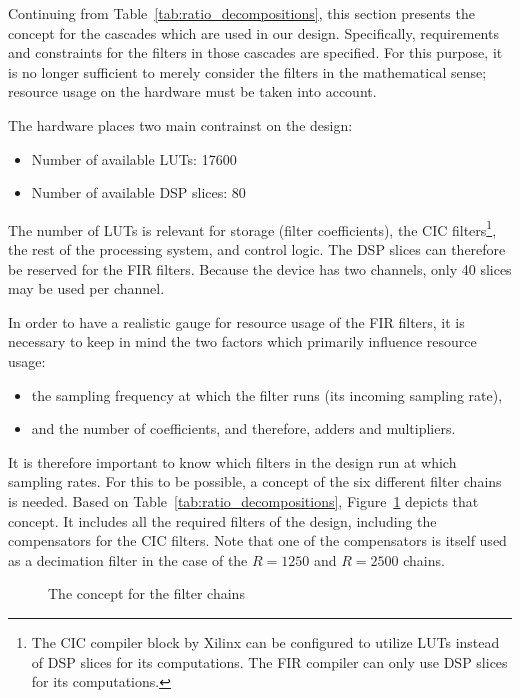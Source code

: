 Continuing  from Table~\ref{tab:ratio_decompositions},  this section  presents
the  concept for  the cascades  which  are used  in our  design. Specifically,
requirements and constraints for the  filters in those cascades are specified.
For this purpose, it is no longer sufficient to merely consider the filters in
the mathematical  sense; resource  usage on  the hardware  must be  taken into
account.

The hardware places two main contrainst on the design:
\begin{itemize}\tightlist
    \item
        Number of available LUTs: \num{17600}
    \item
        Number of available DSP slices: \num{80}
\end{itemize}
The number  of LUTs  is relevant  for storage  (filter coefficients),  the CIC
filters\footnote{%
    The CIC compiler block by Xilinx can be configured to utilize LUTs instead
    of DSP  slices for  its computations. The  FIR compiler  can only  use DSP
    slices for its computations.%
},
the  rest of  the processing  system, and  control logic. The  DSP slices  can
therefore  be  reserved  for  the  FIR filters. Because  the  device  has  two
channels, only 40 slices may be used per channel.

In order to have  a realistic gauge for resource usage of  the FIR filters, it
is  necessary to  keep  in  mind the  two  factors  which primarily  influence
resource usage:
\begin{itemize}\tightlist
    \item
        the sampling frequency at which the filter runs (its incoming sampling
        rate),
    \item
         and the number of coefficients, and therefore, adders and multipliers.
\end{itemize}
It is  therefore important to  know which filters in  the design run  at which
sampling  rates. For this  to  be possible,  a concept  of  the six  different
filter  chains   is  needed. Based   on  Table~\ref{tab:ratio_decompositions},
Figure~\ref{fig:fdesign:chain_concept} depicts  that concept. It  includes all
the required  filters of the  design, including  the compensators for  the CIC
filters. Note that  one of  the compensators  is itself  used as  a decimation
filter in the case of the $R=1250$ and $R=2500$ chains.

\begin{figure}
    \centering
    
    \caption[Filter Chain Concept]{The concept for the filter chains}
    \label{fig:fdesign:chain_concept}
\end{figure}

